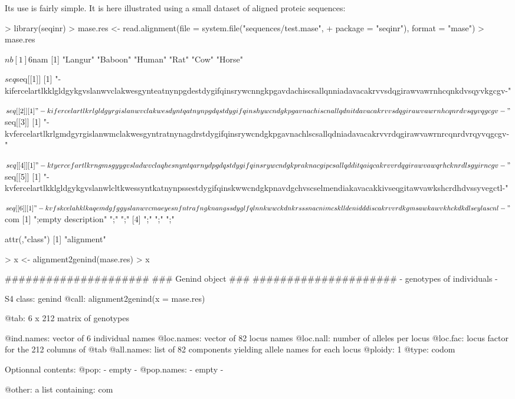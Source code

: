 \documentclass{article}
\begin{document}
Its use is fairly simple. It is here illustrated using a small dataset of aligned proteic sequences:
\begin{Schunk}
\begin{Sinput}
> library(seqinr)
> mase.res <- read.alignment(file = system.file("sequences/test.mase", 
+     package = "seqinr"), format = "mase")
> mase.res
\end{Sinput}
\begin{Soutput}
$nb
[1] 6

$nam
[1] "Langur" "Baboon" "Human"  "Rat"    "Cow"    "Horse" 

$seq
$seq[[1]]
[1] "-kifercelartlkklgldgykgvslanwvclakwesgynteatnynpgdestdygifqinsrywcnngkpgavdachiscsallqnniadavacakrvvsdqgirawvawrnhcqnkdvsqyvkgcgv-"

$seq[[2]]
[1] "-kifercelartlkrlgldgyrgislanwvclakwesdyntqatnynpgdqstdygifqinshywcndgkpgavnachiscnallqdnitdavacakrvvsdqgirawvawrnhcqnrdvsqyvqgcgv-"

$seq[[3]]
[1] "-kvfercelartlkrlgmdgyrgislanwmclakwesgyntratnynagdrstdygifqinsrywcndgkpgavnachlscsallqdniadavacakrvvrdqgirawvawrnrcqnrdvrqyvqgcgv-"

$seq[[4]]
[1] "-ktyercefartlkrngmsgyygvsladwvclaqhesnyntqarnydpgdqstdygifqinsrywcndgkpraknacgipcsallqdditqaiqcakrvvrdqgirawvawqrhcknrdlsgyirncgv-"

$seq[[5]]
[1] "-kvfercelartlkklgldgykgvslanwlcltkwessyntkatnynpssestdygifqinskwwcndgkpnavdgchvscselmendiakavacakkivseqgitawvawkshcrdhdvssyvegctl-"

$seq[[6]]
[1] "-kvfskcelahklkaqemdgfggyslanwvcmaeyesnfntrafngknangssdyglfqlnnkwwckdnkrsssnacnimcsklldenidddiscakrvvrdkgmsawkawvkhckdkdlseylascnl-"


$com
[1] ";empty description\n" ";\n"                  ";\n"                 
[4] ";\n"                  ";\n"                  ";\n"                 

attr(,"class")
[1] "alignment"
\end{Soutput}
\begin{Sinput}
> x <- alignment2genind(mase.res)
> x
\end{Sinput}
\begin{Soutput}
   #####################
   ### Genind object ### 
   #####################
- genotypes of individuals - 

S4 class:  genind
@call: alignment2genind(x = mase.res)

@tab:  6 x 212 matrix of genotypes

@ind.names: vector of  6 individual names
@loc.names: vector of  82 locus names
@loc.nall: number of alleles per locus
@loc.fac: locus factor for the  212 columns of @tab
@all.names: list of  82 components yielding allele names for each locus
@ploidy:  1
@type:  codom

Optionnal contents: 
@pop:  - empty -
@pop.names:  - empty -

@other: a list containing: com 
\end{Soutput}
\end{Schunk}
\end{document}
